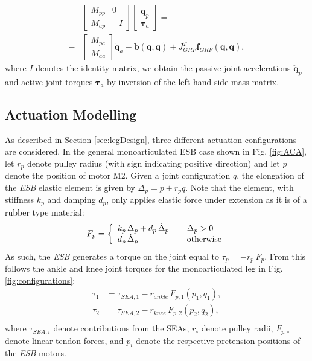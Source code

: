 \documentclass[letterpaper, 10 pt, conference]{ieeeconf}  %
\begin{document}
\begin{equation}
	\begin{aligned}
		&\left[\begin{array}{cc}  
		M_{pp} & 0\\
		M_{ap} &-I
		\end{array} \right]
		\left[\begin{array}{c}  
		\mathbf{\ddot q}_p\\
		\boldsymbol{\tau}_a
		\end{array} \right] =\\ 
		-&
		\left[\begin{array}{c}  
		M_{pa}\\
		M_{aa}
		\end{array} \right] 
		\mathbf{\ddot q}_a-
		\mathbf{b(q, \dot q)}+
		J_{GRF}^T \mathbf{f}_{GRF}\mathbf{(q, \dot q)},
	\end{aligned}
\end{equation}	
where $I$ denotes the identity matrix, we obtain the passive joint accelerations $\mathbf{\ddot q}_p$ and active joint torques $\boldsymbol{\tau}_a$ by inversion of the left-hand side mass matrix.


\subsection{Actuation Modelling}
\label{subsec:actuationModel}
As described in Section \ref{sec:legDesign}, three different actuation configurations are considered. In the general monoarticulated ESB case shown in Fig. \ref{fig:ACA}, let $r_p$ denote pulley radius (with sign indicating positive direction) and let $p$ denote the position of motor M2. Given a joint configuration $q$, the elongation of the \textit{ESB} elastic element is given by $\Delta_p = p + r_p q$. Note that the element, with stiffness $k_p$ and damping $d_p$, only applies elastic force under extension as it is of a rubber type material:
\begin{equation}
	F_p =	\left\lbrace
	\begin{array}{ll}
	k_p \, \Delta_p + d_p \, \dot{\Delta}_p	\hspace{0.4cm} & \Delta_p > 0\\
	d_p \, \dot{\Delta}_p & \text{otherwise}
	\end{array}
	\right.
	\label{eq:F_p}
\end{equation}   
As such, the \textit{ESB} generates a torque on the joint equal to $\tau_p = -r_p \, F_p$. From this follows the ankle and knee joint torques for the monoarticulated leg in Fig. \ref{fig:configurations}:
\begin{equation}
	\begin{aligned}
		\tau_1 &= \tau_{SEA,1} - r_{ankle} \, F_{p,1}(p_1,q_1), \\
		\tau_2 &= \tau_{SEA,2} - r_{knee} \, F_{p,2}(p_2,q_2), \\
	\end{aligned}
\end{equation}
where $\tau_{SEA,i}$ denote contributions from the SEAs, $r_\circ$ denote pulley radii, $F_{p,\circ}$ denote linear tendon forces, and $p_i$ denote the respective pretension positions of the \textit{ESB} motors.
\end{document}
